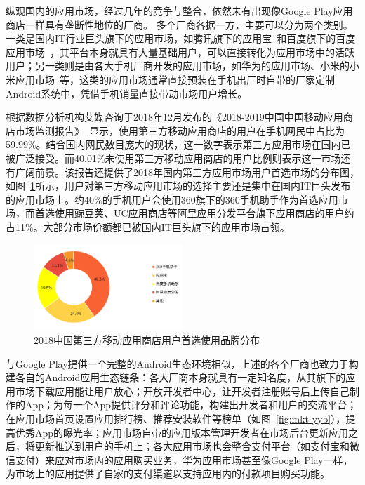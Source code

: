 纵观国内的应用市场，经过几年的竞争与整合，依然未有出现像Google Play应用商店一样具有垄断性地位的厂商。
多个厂商各据一方，主要可以分为两个类别。
一类是国内IT行业巨头旗下的应用市场，如腾讯旗下的应用宝~\cite{Myapp}和百度旗下的百度应用市场~\cite{Baiduappstore}，其平台本身就具有大量基础用户，可以直接转化为应用市场中的活跃用户；另一类则是由各大手机厂商开发的应用市场，如华为的应用市场、小米的小米应用市场~\cite{Xiaomiappstore}等，这类的应用市场通常直接预装在手机出厂时自带的厂家定制Android系统中，凭借手机销量直接带动市场用户增长。

根据数据分析机构艾媒咨询于2018年12月发布的《2018-2019中国中国移动应用商店市场监测报告》~\cite{ChineseAppStoreReport}显示，使用第三方移动应用商店的用户在手机网民中占比为59.99\%。结合国内网民数目庞大的现状，这一数字表示第三方应用市场在国内已被广泛接受。而40.01\%未使用第三方移动应用商店的用户比例则表示这一市场还有广阔前景。该报告还提供了2018年国内第三方应用市场用户首选市场的分布图，如图~\ref{fig:CHN-Mkt-Dist}所示，用户对第三方移动应用市场的选择主要还是集中在国内IT巨头发布的应用市场上。约40\%的手机用户会使用360旗下的360手机助手作为首选应用市场，而首选使用豌豆荚、UC应用商店等阿里应用分发平台旗下应用商店的用户约占11\%。大部分市场份额都已被国内IT巨头旗下的应用市场占领。

\begin{figure}[htbp]
	\centering
	\includegraphics[width=0.5\textwidth]{./Figures/edwin-CHN-mkt-dist.png}
	\caption{2018中国第三方移动应用商店用户首选使用品牌分布}
	\label{fig:CHN-Mkt-Dist}
\end{figure}

与Google Play提供一个完整的Android生态环境相似，上述的各个厂商也致力于构建各自的Android应用生态链条：各大厂商本身就具有一定知名度，从其旗下的应用市场下载应用能让用户放心；开放开发者中心，让开发者注册账号后上传自己制作的App；为每一个App提供评分和评论功能，构建出开发者和用户的交流平台；在应用市场首页设置应用排行榜、推荐安装软件等榜单（如图~\ref{fig:mkt-yyb}），提高优秀App的曝光率；应用市场自带的应用版本管理开发者在市场后台更新应用之后，将更新推送到用户的手机上；各大应用市场也会整合支付平台（如支付宝和微信支付）来应对市场内的应用购买业务，华为应用市场甚至像Google Play一样，为市场上的应用提供了自家的支付渠道以支持应用内的付款项目购买功能。

